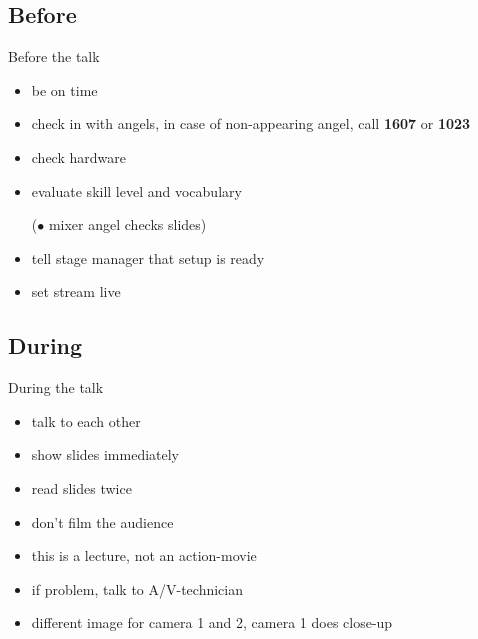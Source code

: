 \documentclass[hyperref={pdfpagelabels=false},aspectratio=169]{beamer}
\begin{document}
\subsection{Before}
\begin{frame}{Before the talk}
\begin{itemize} [<+->] %
\item be on time %
\item check in with angels, in case of non-appearing angel, call \textbf{1607} or \textbf{1023} %
\item check hardware %
\item evaluate skill level and vocabulary %
\item [($\bullet$] mixer angel checks slides) %
\item tell stage manager that setup is ready
\item set stream live %
\end{itemize} 
\end{frame}

\subsection{During} %
\begin{frame}{During the talk}
\begin{itemize}[<+->] 
\item talk to each other %
\item show slides immediately
\item read slides twice
\item don't film the audience
\item this is a lecture, not an action-movie 
\item if problem, talk to A/V-technician
\item different image for camera 1 and 2, camera 1 does close-up
\end{itemize} 
\end{frame}
\end{document}
